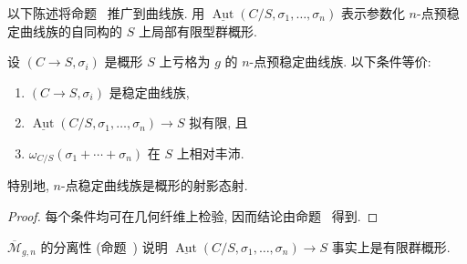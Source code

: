 以下陈述将命题~ 推广到曲线族. 用 $\underline{\operatorname{Aut}}(C/S,\allowbreak \sigma_1,\allowbreak \ldots,\allowbreak \sigma_n)$ 表示参数化 $n$-点预稳定曲线族的自同构的 $S$ 上局部有限型群概形.
\begin{proposition}\label{src:6.3.22}
设 $(C\to\allowbreak S,\allowbreak \sigma_i)$ 是概形 $S$ 上亏格为 $g$ 的 $n$-点预稳定曲线族. 以下条件等价:
\begin{enumerate}[(1)]
\item $(C\to\allowbreak S,\allowbreak \sigma_i)$ 是稳定曲线族,
\item $\underline{\operatorname{Aut}}(C/S,\allowbreak \sigma_1,\allowbreak \ldots,\allowbreak \sigma_n)\to\allowbreak S$ 拟有限, 且
\item $\omega_{C/S}(\sigma_1+\cdots+\sigma_n)$ 在 $S$ 上相对丰沛.
\end{enumerate}
特别地, $n$-点稳定曲线族是概形的射影态射.
\end{proposition}
\begin{proof}
每个条件均可在几何纤维上检验, 因而结论由命题~ 得到.
\end{proof}
$\overline{\mathcal M}_{g,\allowbreak n}$ 的分离性 (命题~) 说明 $\underline{\operatorname{Aut}}(C/S,\allowbreak \sigma_1,\allowbreak \ldots,\allowbreak \sigma_n)\to\allowbreak S$ 事实上是有限群概形.

